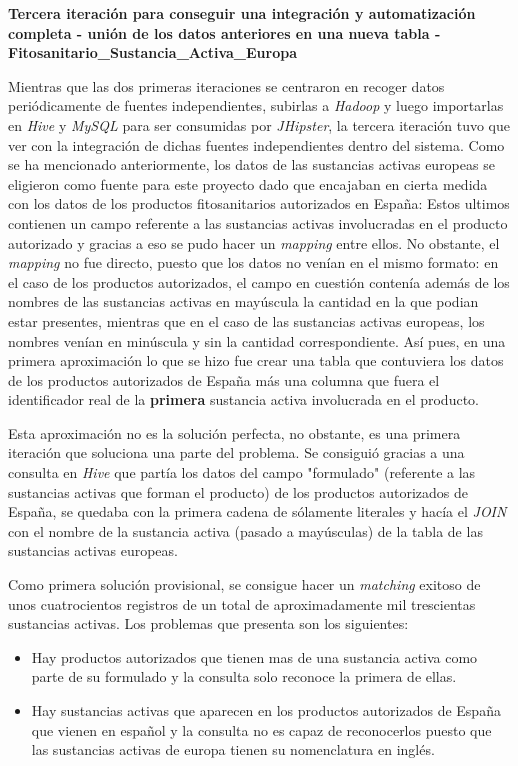\par 
\textbf{Tercera iteración para conseguir una integración y automatización completa - unión de los datos anteriores en una nueva tabla - Fitosanitario\_Sustancia\_Activa\_Europa}
\bigskip
\par 
Mientras que las dos primeras iteraciones se centraron en recoger datos periódicamente de fuentes independientes, subirlas a \textit{Hadoop} y luego importarlas en \textit{Hive} y \textit{MySQL} para ser consumidas por \textit{JHipster}, la tercera iteración tuvo que ver con la integración de dichas fuentes independientes dentro del sistema. Como se ha mencionado anteriormente, los datos de las sustancias activas europeas se eligieron como fuente para este proyecto dado que encajaban en cierta medida con los datos de los productos fitosanitarios autorizados en España:  Estos ultimos contienen un campo referente a las sustancias activas involucradas en el producto autorizado y gracias a eso se pudo hacer un \textit{mapping} entre ellos. No obstante, el \textit{mapping} no fue directo, puesto que los datos no venían en el mismo formato: en el caso de los productos autorizados, el campo en cuestión contenía además de los nombres de las sustancias activas en mayúscula la cantidad en la que podian estar presentes, mientras que en el caso de las sustancias activas europeas, los nombres venían en minúscula y sin la cantidad correspondiente. Así pues, en una primera aproximación lo que se hizo fue crear una tabla que contuviera los datos de los productos autorizados de España más una columna que fuera el identificador real de la \textbf{primera} sustancia activa involucrada en el producto. \par Esta aproximación no es la solución perfecta, no obstante, es una primera iteración que soluciona una parte del problema. Se consiguió gracias a una consulta en \textit{Hive} que partía los datos del campo "formulado" (referente a las sustancias activas que forman el producto) de los productos autorizados de España, se quedaba con la primera cadena de sólamente literales y hacía el \textit{JOIN} con el nombre de la sustancia activa (pasado a mayúsculas) de la tabla de las sustancias activas europeas. 
\par Como primera solución provisional, se consigue hacer un \textit{matching} exitoso de unos cuatrocientos registros de un total de aproximadamente mil trescientas sustancias activas. Los problemas que presenta son los siguientes: 


\begin{itemize}
\item Hay productos autorizados que tienen mas de una sustancia activa como parte de su formulado y la consulta solo reconoce la primera de ellas.
\item Hay sustancias activas que aparecen en los productos autorizados de España que vienen en español y la consulta no es capaz de reconocerlos puesto que las sustancias activas de europa tienen su nomenclatura en inglés.
\end{itemize}


